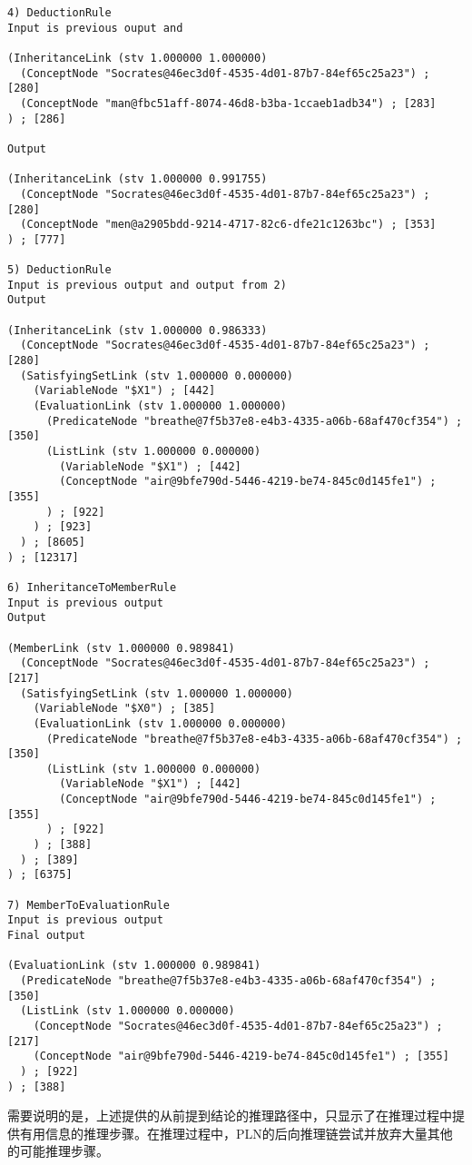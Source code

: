 {\begin{small}
\begin{lstlisting}
4) DeductionRule
Input is previous ouput and

(InheritanceLink (stv 1.000000 1.000000)
  (ConceptNode "Socrates@46ec3d0f-4535-4d01-87b7-84ef65c25a23") ; [280]
  (ConceptNode "man@fbc51aff-8074-46d8-b3ba-1ccaeb1adb34") ; [283]
) ; [286]

Output

(InheritanceLink (stv 1.000000 0.991755)
  (ConceptNode "Socrates@46ec3d0f-4535-4d01-87b7-84ef65c25a23") ; [280]
  (ConceptNode "men@a2905bdd-9214-4717-82c6-dfe21c1263bc") ; [353]
) ; [777]

5) DeductionRule
Input is previous output and output from 2)
Output

(InheritanceLink (stv 1.000000 0.986333)
  (ConceptNode "Socrates@46ec3d0f-4535-4d01-87b7-84ef65c25a23") ; [280]
  (SatisfyingSetLink (stv 1.000000 0.000000)
    (VariableNode "$X1") ; [442]
    (EvaluationLink (stv 1.000000 1.000000)
      (PredicateNode "breathe@7f5b37e8-e4b3-4335-a06b-68af470cf354") ; [350]
      (ListLink (stv 1.000000 0.000000)
        (VariableNode "$X1") ; [442]
        (ConceptNode "air@9bfe790d-5446-4219-be74-845c0d145fe1") ; [355]
      ) ; [922]
    ) ; [923]
  ) ; [8605]
) ; [12317]

6) InheritanceToMemberRule
Input is previous output
Output

(MemberLink (stv 1.000000 0.989841)
  (ConceptNode "Socrates@46ec3d0f-4535-4d01-87b7-84ef65c25a23") ; [217]
  (SatisfyingSetLink (stv 1.000000 1.000000)
    (VariableNode "$X0") ; [385]
    (EvaluationLink (stv 1.000000 0.000000)
      (PredicateNode "breathe@7f5b37e8-e4b3-4335-a06b-68af470cf354") ; [350]
      (ListLink (stv 1.000000 0.000000)
        (VariableNode "$X1") ; [442]
        (ConceptNode "air@9bfe790d-5446-4219-be74-845c0d145fe1") ; [355]
      ) ; [922]
    ) ; [388]
  ) ; [389]
) ; [6375]

7) MemberToEvaluationRule
Input is previous output
Final output

(EvaluationLink (stv 1.000000 0.989841)
  (PredicateNode "breathe@7f5b37e8-e4b3-4335-a06b-68af470cf354") ; [350]
  (ListLink (stv 1.000000 0.000000)
    (ConceptNode "Socrates@46ec3d0f-4535-4d01-87b7-84ef65c25a23") ; [217]
    (ConceptNode "air@9bfe790d-5446-4219-be74-845c0d145fe1") ; [355]
  ) ; [922]
) ; [388]
 \end{lstlisting}\end{small}}

\noindent 需要说明的是，上述提供的从前提到结论的推理路径中，只显示了在推理过程中提供有用信息的推理步骤。在推理过程中，PLN的后向推理链尝试并放弃大量其他的可能推理步骤。


